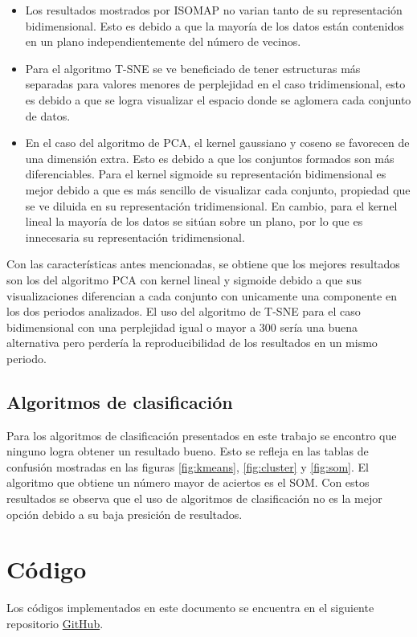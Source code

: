 \begin{itemize}
    \item Los resultados mostrados por ISOMAP no varian tanto de su representación bidimensional. Esto es debido a que la mayoría de los datos están contenidos en un plano independientemente del número de vecinos.
    \item Para el algoritmo T-SNE se ve beneficiado de tener estructuras más separadas para valores menores de perplejidad en el caso tridimensional, esto es debido a que se logra visualizar el espacio donde se aglomera cada conjunto de datos.
    \item En el caso del algoritmo de PCA, el kernel gaussiano y coseno se favorecen de una dimensión extra. Esto es debido a que los conjuntos formados son más diferenciables. Para el kernel sigmoide su representación bidimensional es mejor debido a que es más sencillo de visualizar cada conjunto, propiedad que se ve diluida en su representación tridimensional. En cambio, para el kernel lineal la mayoría de los datos se sitúan sobre un plano, por lo que es innecesaria su representación tridimensional.
\end{itemize}

Con las características antes mencionadas, se obtiene que los mejores resultados son los del algoritmo PCA con kernel lineal y sigmoide debido a que sus visualizaciones diferencian a cada conjunto con unicamente una componente en los dos periodos analizados. El uso del algoritmo de T-SNE para el caso bidimensional con una perplejidad igual o mayor a 300 sería una buena alternativa pero perdería la reproducibilidad de los resultados en un mismo periodo.

\subsection{Algoritmos de clasificación}

Para los algoritmos de clasificación presentados en este trabajo se encontro que ninguno logra obtener un resultado bueno. Esto se refleja en las tablas de confusión mostradas en las figuras \ref{fig:kmeans}, \ref{fig:cluster} y \ref{fig:som}. El algoritmo que obtiene un número mayor de aciertos es el SOM. Con estos resultados se observa que el uso de algoritmos de clasificación no es la mejor opción debido a su baja presición de resultados.

\section{Código}

Los códigos implementados en este documento se encuentra en el siguiente repositorio \href{https://github.com/giovannilopez9808/Reconocimiento_de_patrones_proyecto}{GitHub}.